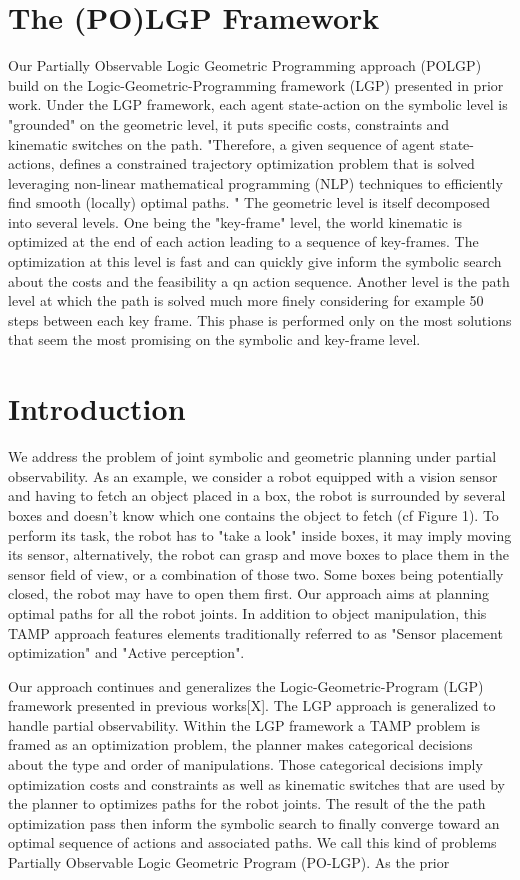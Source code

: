 \section{The (PO)LGP Framework}
Our Partially Observable Logic Geometric Programming approach (POLGP) build on the Logic-Geometric-Programming framework (LGP) presented in prior work.
Under the LGP framework, each agent state-action on the symbolic level is "grounded" on the geometric level, it puts specific costs, constraints and kinematic switches on the path. 
"Therefore, a given sequence of agent state-actions, defines a constrained trajectory optimization problem that is solved leveraging non-linear mathematical
programming (NLP) techniques to efficiently find smooth
(locally) optimal paths. "
The geometric level is itself decomposed into several levels. One being the "key-frame" level, the world kinematic is optimized at the end of each action leading to a sequence of key-frames.
 The optimization at this level is fast and can quickly give inform the symbolic search about the costs and the feasibility a qn action sequence. 
Another level is the path level at which the path is solved much more finely considering for example 50 steps between each key frame. This phase is performed only on the most solutions that seem the most promising on the symbolic and key-frame level.

\section{Introduction}
We address the problem of joint symbolic and geometric planning under partial observability. As an example, we consider a robot equipped with a vision sensor and having to fetch  an object placed in a box, the robot is surrounded by several boxes and doesn't know which one contains the object to fetch (cf Figure 1). To perform its task, the robot has to "take a look" inside boxes, it may imply moving its sensor, alternatively, the robot can grasp and move boxes to place them in the sensor field of view, or a combination of those two. Some boxes being potentially closed, the robot may have to open them first. Our approach aims at planning optimal paths for all the robot joints. In addition to object manipulation, this TAMP approach features elements traditionally referred to as "Sensor placement optimization" and "Active perception".

Our approach continues and generalizes the Logic-Geometric-Program (LGP) framework presented in previous works[X]. The LGP approach is generalized to handle partial observability. Within the LGP framework a TAMP problem is framed as an optimization problem, the planner makes categorical
decisions about the type and order of manipulations. Those categorical decisions imply optimization costs and constraints as well as kinematic switches that are used by the planner to optimizes paths for the robot joints. The result of the the path optimization pass then inform the symbolic search to finally converge toward an optimal sequence of actions and associated paths. We call this kind of problems Partially Observable Logic Geometric Program (PO-LGP). As the prior 

